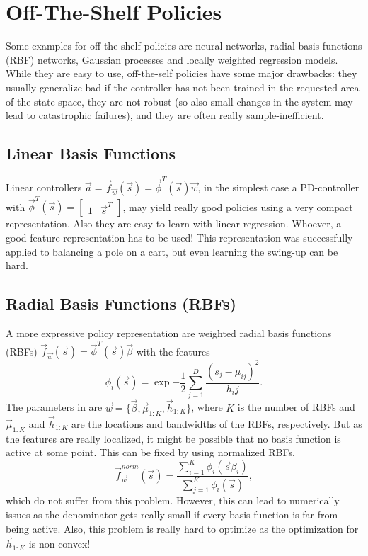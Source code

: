 	\section{Off-The-Shelf Policies}
		Some examples for off-the-shelf policies are neural networks, radial basis functions (RBF) networks, Gaussian processes and locally weighted regression models. While they are easy to use, off-the-self policies have some major drawbacks: they usually generalize bad if the controller has not been trained in the requested area of the state space, they are not robust (so also small changes in the system may lead to catastrophic failures), and they are often really sample-inefficient.

		\subsection{Linear Basis Functions}
			Linear controllers \( \vec{a} = \vec{f}_{\vec{w}}(\vec{s}) = \vec{\phi}^T(\vec{s}) \vec{w} \), in the simplest case a PD-controller with \( \vec{\phi}^T(\vec{s}) = \begin{bmatrix} 1 & \vec{s}^T \end{bmatrix} \), may yield really good policies using a very compact representation. Also they are easy to learn with linear regression. Whoever, a good feature representation has to be used! This representation was successfully applied to balancing a pole on a cart, but even learning the swing-up can be hard.

		\subsection{Radial Basis Functions (RBFs)}
			A more expressive policy representation are weighted radial basis functions (RBFs) \( \vec{f}_{\vec{w}}(\vec{s}) = \vec{\phi}^T(\vec{s}) \vec{\beta} \) with the features
			\begin{equation*}
				\phi_i(\vec{s}) = \exp{ -\frac{1}{2} \sum_{j = 1}^{D} \frac{(s_j - \mu_{ij})^2}{h_ij} }.
			\end{equation*}
			The parameters in are \( \vec{w} = \{ \vec{\beta}, \vec{\mu}_{1:K}, \vec{h}_{1:K} \} \), where \(K\) is the number of RBFs and \(\vec{\mu}_{1:K}\) and \(\vec{h}_{1:K}\) are the locations and bandwidths of the RBFs, respectively. But as the features are really localized, it might be possible that no basis function is active at some point. This can be fixed by using normalized RBFs,
			\begin{equation*}
				\vec{f}_{\vec{w}}^\mathit{norm}(\vec{s}) = \frac{\sum_{i = 1}^{K} \phi_i(\vec{s} \beta_i)}{\sum_{j = 1}^{K} \phi_i(\vec{s})},
			\end{equation*}
			which do not suffer from this problem. However, this can lead to numerically issues as the denominator gets really small if every basis function is far from being active. Also, this problem is really hard to optimize as the optimization for \( \vec{h}_{1:K} \) is non-convex!

